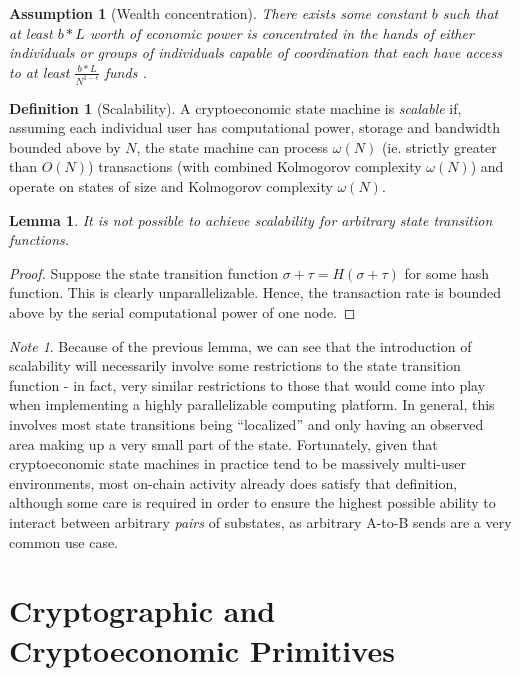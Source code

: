 \documentclass[11pt,a4paper]{report}
\theoremstyle{plain}
\newtheorem{lem}[thm]{Lemma}
\newtheorem{assm}{Assumption}[chapter]
\theoremstyle{definition}
\newtheorem{defn}{Definition}[chapter]
\theoremstyle{remark}
\newtheorem*{note}{Note}
\begin{document}
\begin{assm}[Wealth concentration]
There exists some constant $b$ such that at least $b * L$ worth of economic power is concentrated in the hands of either individuals or groups of individuals capable of coordination that each have access to at least $\frac{b * L}{N^{1-\epsilon}}$ funds \citep{piketty_capital_2014}.
\end{assm}

\begin{defn}[Scalability]
A cryptoeconomic state machine is \emph{scalable} if, assuming each individual user has computational power, storage and bandwidth bounded above by $N$, the state machine can process $\omega(N)$ (ie. strictly greater than $O(N)$) transactions (with combined Kolmogorov complexity $\omega(N)$) and operate on states of size and Kolmogorov complexity $\omega(N)$.
\end{defn}

\begin{lem}
It is not possible to achieve scalability for arbitrary state transition functions.
\end{lem}
\begin{proof}
Suppose the state transition function $\sigma + \tau = H(\sigma + \tau)$ for some hash function. This is clearly unparallelizable. Hence, the transaction rate is bounded above by the serial computational power of one node.
\end{proof}

\begin{note}
Because of the previous lemma, we can see that the introduction of scalability will necessarily involve some restrictions to the state transition function - in fact, very similar restrictions to those that would come into play when implementing a highly parallelizable computing platform. In general, this involves most state transitions being ``localized'' and only having an observed area making up a very small part of the state. Fortunately, given that cryptoeconomic state machines in practice tend to be massively multi-user environments, most on-chain activity already does satisfy that definition, although some care is required in order to ensure the highest possible ability to interact between arbitrary \emph{pairs} of substates, as arbitrary A-to-B sends are a very common use case.
\end{note}


\chapter{Cryptographic and Cryptoeconomic Primitives}
\end{document}
